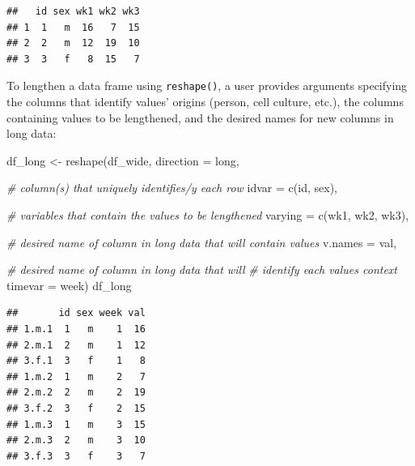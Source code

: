 \documentclass[
]{book}
\newenvironment{Shaded}{\begin{snugshade}}{\end{snugshade}}
\newcommand{\AttributeTok}[1]{\textcolor[rgb]{0.77,0.63,0.00}{#1}}
\newcommand{\CommentTok}[1]{\textcolor[rgb]{0.56,0.35,0.01}{\textit{#1}}}
\newcommand{\FunctionTok}[1]{\textcolor[rgb]{0.00,0.00,0.00}{#1}}
\newcommand{\NormalTok}[1]{#1}
\newcommand{\OtherTok}[1]{\textcolor[rgb]{0.56,0.35,0.01}{#1}}
\newcommand{\StringTok}[1]{\textcolor[rgb]{0.31,0.60,0.02}{#1}}
\begin{document}
\begin{verbatim}
##   id sex wk1 wk2 wk3
## 1  1   m  16   7  15
## 2  2   m  12  19  10
## 3  3   f   8  15   7
\end{verbatim}

To lengthen a data frame using \texttt{reshape()}, a user provides arguments specifying the columns that identify values' origins (person, cell culture, etc.), the columns containing values to be lengthened, and the desired names for new columns in long data:

\begin{Shaded}
\begin{Highlighting}[]
\NormalTok{df\_long }\OtherTok{\textless{}{-}} \FunctionTok{reshape}\NormalTok{(df\_wide,}
                   \AttributeTok{direction =} \StringTok{\textquotesingle{}long\textquotesingle{}}\NormalTok{,}
                   
                   \CommentTok{\# column(s) that uniquely identifies/y each row}
                   \AttributeTok{idvar =} \FunctionTok{c}\NormalTok{(}\StringTok{\textquotesingle{}id\textquotesingle{}}\NormalTok{, }\StringTok{\textquotesingle{}sex\textquotesingle{}}\NormalTok{), }
                   
                   \CommentTok{\# variables that contain the values to be lengthened}
                   \AttributeTok{varying =} \FunctionTok{c}\NormalTok{(}\StringTok{\textquotesingle{}wk1\textquotesingle{}}\NormalTok{, }\StringTok{\textquotesingle{}wk2\textquotesingle{}}\NormalTok{, }\StringTok{\textquotesingle{}wk3\textquotesingle{}}\NormalTok{), }
                   
                   \CommentTok{\# desired name of column in long data that will contain values}
                   \AttributeTok{v.names =} \StringTok{\textquotesingle{}val\textquotesingle{}}\NormalTok{, }
                   
                   \CommentTok{\# desired name of column in long data that will }
                   \CommentTok{\# identify each value\textquotesingle{}s context}
                   \AttributeTok{timevar =} \StringTok{\textquotesingle{}week\textquotesingle{}}\NormalTok{)}
\NormalTok{df\_long}
\end{Highlighting}
\end{Shaded}

\begin{verbatim}
##       id sex week val
## 1.m.1  1   m    1  16
## 2.m.1  2   m    1  12
## 3.f.1  3   f    1   8
## 1.m.2  1   m    2   7
## 2.m.2  2   m    2  19
## 3.f.2  3   f    2  15
## 1.m.3  1   m    3  15
## 2.m.3  2   m    3  10
## 3.f.3  3   f    3   7
\end{verbatim}
\end{document}
